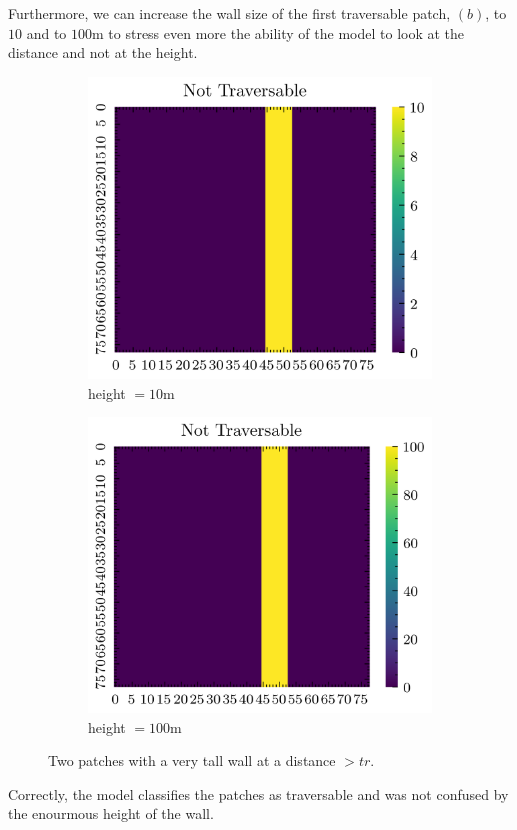 Furthermore, we can increase the wall size of the first traversable patch, $(b)$, to $10$ and to $100$m to stress even more the ability of the model to look at the distance and not at the height.

\begin{figure}[H]
    \centering
    \begin{subfigure}[b]{0.33\textwidth}
        \includegraphics[width=\linewidth]{../img/5/custom_patches/walls_front/big-1-2d.png}
    \caption{height $=10$m}
    \end{subfigure}   
    \begin{subfigure}[b]{0.33\textwidth}
        \includegraphics[width=\linewidth]{../img/5/custom_patches/walls_front/big-2-2d.png}
        \caption{height $=100$m}
    \end{subfigure}   
\caption{Two patches with a very tall wall at a distance $> tr$.}    
\end{figure}
Correctly, the model classifies the patches as traversable and was not confused by the enourmous height of the wall.


